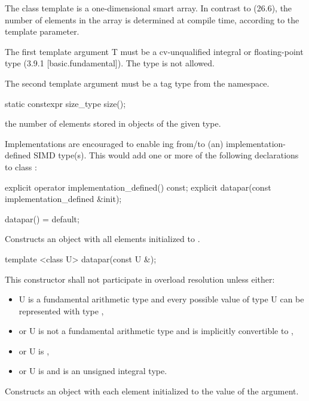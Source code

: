 

\pnum The class template \datapar{} is a one-dimensional smart array.
In contrast to  (26.6), the number of elements in the array is determined at compile time, according to the  template parameter.

\pnum The first template argument \type T must be a cv-unqualified integral or floating-point type (3.9.1 [basic.fundamental]).
The type \bool is not allowed.

\pnum The second template argument  must be a tag type from the  namespace.

\begin{itemdecl}
static constexpr size_type size();
\end{itemdecl}
\begin{itemdescr}
  \pnum\returns the number of elements stored in objects of the given \datapar[<T, Abi>] type.
\end{itemdescr}

\pnum\realnote Implementations are encouraged to enable ing from/to (an) implementation-defined SIMD type(s).
This would add one or more of the following declarations to class \datapar:
\begin{itemdecl}
explicit operator implementation_defined() const;
explicit datapar(const implementation_defined &init);
\end{itemdecl}

\begin{itemdecl}
datapar() = default;
\end{itemdecl}
\begin{itemdescr}
  \pnum
  \effects
  Constructs an object with all elements initialized to .
\end{itemdescr}

\begin{itemdecl}
template <class U> datapar(const U &);
\end{itemdecl}
\begin{itemdescr}
  \pnum\remarks This constructor shall not participate in overload resolution unless either:
  \begin{itemize}
    \item \type U is a fundamental arithmetic type and every possible value of type \type U can be represented with type ,
    \item or \type U is not a fundamental arithmetic type and is implicitly convertible to ,
    \item or \type U is \intt,
    \item or \type U is \uint and  is an unsigned integral type.
  \end{itemize}
  \pnum\effects Constructs an object with each element initialized to the value of the argument.
\end{itemdescr}

